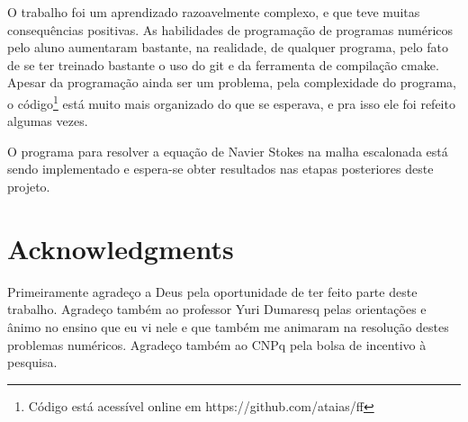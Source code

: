 \documentclass[journal]{IEEEtran}
\begin{document}
O trabalho foi um aprendizado razoavelmente complexo, e que teve muitas consequências positivas. As habilidades de programação de programas numéricos pelo aluno aumentaram bastante, na realidade, de qualquer programa, pelo fato de se ter treinado bastante o uso do git e da ferramenta de compilação cmake. Apesar da programação ainda ser um problema, pela complexidade do programa, o código\footnote{Código está acessível online em https://github.com/ataias/ff} está muito mais organizado do que se esperava, e pra isso ele foi refeito algumas vezes.

O programa para resolver a equação de Navier Stokes na malha escalonada está sendo implementado e espera-se obter resultados nas etapas posteriores deste projeto.

\section*{Acknowledgments}

Primeiramente agradeço a Deus pela oportunidade de ter feito parte deste trabalho. Agradeço também ao professor Yuri Dumaresq pelas orientações e ânimo no ensino que eu vi nele e que também me animaram na resolução destes problemas numéricos. Agradeço também ao CNPq pela bolsa de incentivo à pesquisa.
%



\end{document}
